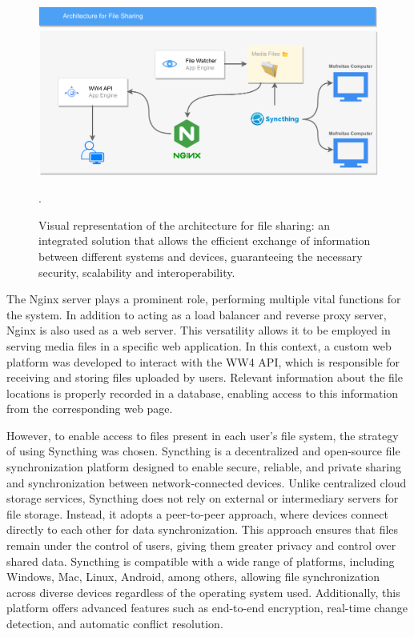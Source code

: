 \begin{figure}[ht!]
    \centering
    \includegraphics[width=.65\linewidth]{images/Development/chap4/Superviser.pdf} 
    \caption{Visual representation of the architecture for file sharing: an integrated solution that allows the efficient exchange of information between different systems and devices, guaranteeing the necessary security, scalability and interoperability.}.
    \label{fig: superviser}
\end{figure}

The Nginx server plays a prominent role, performing multiple vital functions for the system. In addition to acting as a load balancer and reverse proxy server, Nginx is also used as a web server. This versatility allows it to be employed in serving media files in a specific web application. In this context, a custom web platform was developed to interact with the WW4 API, which is responsible for receiving and storing files uploaded by users. Relevant information about the file locations is properly recorded in a database, enabling access to this information from the corresponding web page.

However, to enable access to files present in each user's file system, the strategy of using Syncthing was chosen. Syncthing is a decentralized and open-source file synchronization platform designed to enable secure, reliable, and private sharing and synchronization between network-connected devices. Unlike centralized cloud storage services, Syncthing does not rely on external or intermediary servers for file storage. Instead, it adopts a peer-to-peer approach, where devices connect directly to each other for data synchronization. This approach ensures that files remain under the control of users, giving them greater privacy and control over shared data. Syncthing is compatible with a wide range of platforms, including Windows, Mac, Linux, Android, among others, allowing file synchronization across diverse devices regardless of the operating system used. Additionally, this platform offers advanced features such as end-to-end encryption, real-time change detection, and automatic conflict resolution.

